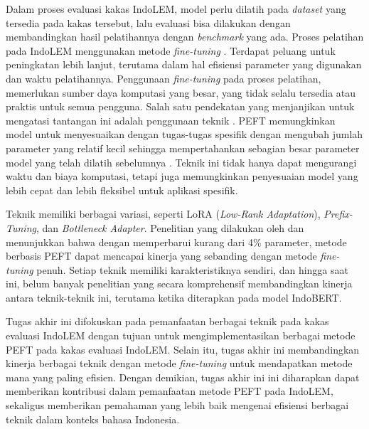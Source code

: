 Dalam proses evaluasi kakas IndoLEM, model perlu dilatih pada \textit{dataset} yang tersedia pada kakas tersebut, lalu evaluasi bisa dilakukan dengan membandingkan hasil pelatihannya dengan \textit{benchmark} yang ada. Proses pelatihan pada IndoLEM menggunakan metode \textit{fine-tuning} \parencite{indolem}. Terdapat peluang untuk peningkatan lebih lanjut, terutama dalam hal efisiensi parameter yang digunakan dan waktu pelatihannya. Penggunaan \textit{fine-tuning} pada proses pelatihan, memerlukan sumber daya komputasi yang besar, yang tidak selalu tersedia atau praktis untuk semua pengguna. Salah satu pendekatan yang menjanjikan untuk mengatasi tantangan ini adalah penggunaan teknik \PEFT. PEFT memungkinkan model untuk menyesuaikan dengan tugas-tugas spesifik dengan mengubah jumlah parameter yang relatif kecil sehingga mempertahankan sebagian besar parameter model yang telah dilatih sebelumnya \parencite{adapter}. Teknik ini tidak hanya dapat mengurangi waktu dan biaya komputasi, tetapi juga memungkinkan penyesuaian model yang lebih cepat dan lebih fleksibel untuk aplikasi spesifik. 

Teknik \PEFT memiliki berbagai variasi, seperti LoRA (\textit{Low-Rank Adaptation}), \textit{Prefix-Tuning}, dan \textit{Bottleneck Adapter}. Penelitian yang dilakukan oleh \citeauthor{adapter} \parencite{adapter} dan \citeauthor{uvpl} \parencite{uvpl} menunjukkan bahwa dengan memperbarui kurang dari 4\% parameter, metode berbasis PEFT dapat mencapai kinerja yang sebanding dengan metode \textit{fine-tuning} penuh. Setiap teknik memiliki karakteristiknya sendiri, dan hingga saat ini, belum banyak penelitian yang secara komprehensif membandingkan kinerja antara teknik-teknik ini, terutama ketika diterapkan pada model IndoBERT. 

Tugas akhir ini  difokuskan pada pemanfaatan berbagai teknik \PEFT pada kakas evaluasi IndoLEM dengan tujuan untuk mengimplementasikan berbagai metode PEFT pada kakas evaluasi IndoLEM. Selain itu, tugas akhir ini  membandingkan kinerja berbagai teknik \PEFT dengan metode \textit{fine-tuning}  untuk mendapatkan metode mana yang paling efisien. Dengan demikian, tugas akhir ini ini diharapkan dapat memberikan kontribusi dalam pemanfaatan metode PEFT pada IndoLEM, sekaligus memberikan pemahaman yang lebih baik mengenai efisiensi berbagai teknik \PEFT dalam konteks bahasa Indonesia.

